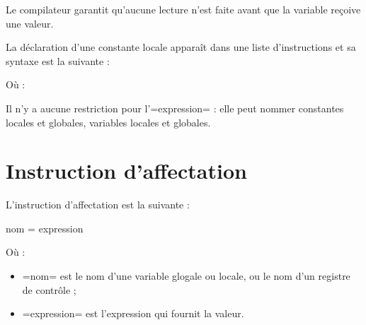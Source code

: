 Le compilateur garantit qu'aucune lecture n'est faite avant que la variable reçoive une valeur.











La déclaration d'une constante locale apparaît dans une liste d'instructions et sa syntaxe est la suivante :


Où :

Il n'y a aucune restriction pour l'\plm=expression= : elle peut nommer constantes locales et globales, variables locales et globales.






\section {Instruction d'affectation}

L'instruction d'affectation est la suivante :

\begin{PLM}
nom = expression
\end{PLM}

Où :
\begin{itemize}
  \item \plm=nom= est le nom d'une variable glogale ou locale, ou le nom d'un registre de contrôle ;
  \item \plm=expression= est l'expression qui fournit la valeur.
\end{itemize}











